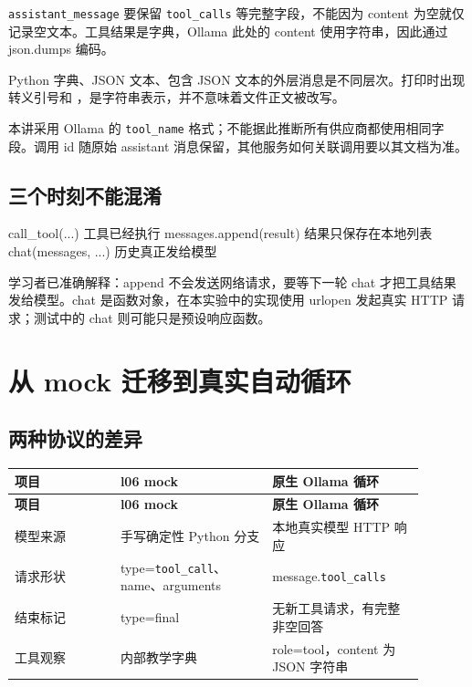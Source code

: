 \documentclass[UTF8,zihao=-4,fontset=fandol]{ctexart}
\newcommand{\code}[1]{{\small\ttfamily\detokenize{#1}}}
\begin{document}
\nolinkurl{assistant_message} 要保留 \nolinkurl{tool_calls} 等完整字段，不能因为 content 为空就仅记录空文本。工具结果是字典，Ollama 此处的 content 使用字符串，因此通过 json.dumps 编码。

Python 字典、JSON 文本、包含 JSON 文本的外层消息是不同层次。打印时出现转义引号和 \code{\n}，是字符串表示，并不意味着文件正文被改写。

本讲采用 Ollama 的 \nolinkurl{tool_name} 格式；不能据此推断所有供应商都使用相同字段。调用 id 随原始 assistant 消息保留，其他服务如何关联调用要以其文档为准。

\subsection{三个时刻不能混淆}

\begin{Code}
call_tool(...)             工具已经执行
messages.append(result)    结果只保存在本地列表
chat(messages, ...)        历史真正发给模型
\end{Code}

学习者已准确解释：append 不会发送网络请求，要等下一轮 chat 才把工具结果发给模型。chat 是函数对象，在本实验中的实现使用 urlopen 发起真实 HTTP 请求；测试中的 chat 则可能只是预设响应函数。

\section{从 mock 迁移到真实自动循环}

\subsection{两种协议的差异}

{\small\setlength{\tabcolsep}{4pt}
\renewcommand{\arraystretch}{1.25}
\begin{longtable}{>{\raggedright\arraybackslash}p{0.23\linewidth}>{\raggedright\arraybackslash}p{0.33\linewidth}>{\raggedright\arraybackslash}p{0.33\linewidth}}
\toprule
\textbf{项目} & \textbf{l06 mock} & \textbf{原生 Ollama 循环} \\
\midrule\endfirsthead
\toprule
\textbf{项目} & \textbf{l06 mock} & \textbf{原生 Ollama 循环} \\
\midrule\endhead
\bottomrule\endfoot
模型来源 & 手写确定性 Python 分支 & 本地真实模型 HTTP 响应 \\
请求形状 & type=\nolinkurl{tool_call}、name、arguments & message.\nolinkurl{tool_calls} \\
结束标记 & type=final & 无新工具请求，有完整非空回答 \\
工具观察 & 内部教学字典 & role=tool，content 为 JSON 字符串 \\
\end{longtable}}
\end{document}
